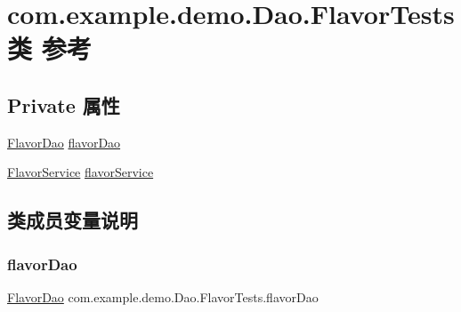 \hypertarget{classcom_1_1example_1_1demo_1_1_dao_1_1_flavor_tests}{}\section{com.\+example.\+demo.\+Dao.\+Flavor\+Tests类 参考}
\label{classcom_1_1example_1_1demo_1_1_dao_1_1_flavor_tests}
\subsection*{Private 属性}
\begin{DoxyCompactItemize}
\item 
\mbox{\hyperlink{interfacecom_1_1example_1_1demo_1_1dao_1_1_flavor_dao}{Flavor\+Dao}} \mbox{\hyperlink{classcom_1_1example_1_1demo_1_1_dao_1_1_flavor_tests_a0675f772a7ac70f44b96e67e70118a48}{flavor\+Dao}}
\item 
\mbox{\hyperlink{classcom_1_1example_1_1demo_1_1service_1_1_flavor_service}{Flavor\+Service}} \mbox{\hyperlink{classcom_1_1example_1_1demo_1_1_dao_1_1_flavor_tests_a5d53bfa83e03ff76a29a44cf4b142cf4}{flavor\+Service}}
\end{DoxyCompactItemize}


\subsection{类成员变量说明}
\mbox{\label{classcom_1_1example_1_1demo_1_1_dao_1_1_flavor_tests_a0675f772a7ac70f44b96e67e70118a48}} 
\subsubsection{\texorpdfstring{flavor\+Dao}{flavorDao}}
{\footnotesize\ttfamily \mbox{\hyperlink{interfacecom_1_1example_1_1demo_1_1dao_1_1_flavor_dao}{Flavor\+Dao}} com.\+example.\+demo.\+Dao.\+Flavor\+Tests.\+flavor\+Dao\hspace{0.3cm}{\ttfamily [private]}}

\mbox{\label{classcom_1_1example_1_1demo_1_1_dao_1_1_flavor_tests_a5d53bfa83e03ff76a29a44cf4b142cf4}} 
